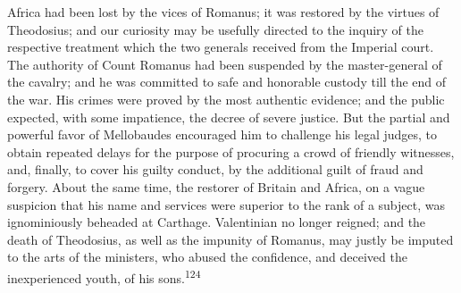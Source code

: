 


Africa had been lost by the vices of Romanus; it was restored by
the virtues of Theodosius; and our curiosity may be usefully
directed to the inquiry of the respective treatment which the two
generals received from the Imperial court. The authority of Count
Romanus had been suspended by the master-general of the cavalry;
and he was committed to safe and honorable custody till the end
of the war. His crimes were proved by the most authentic
evidence; and the public expected, with some impatience, the
decree of severe justice. But the partial and powerful favor of
Mellobaudes encouraged him to challenge his legal judges, to
obtain repeated delays for the purpose of procuring a crowd of
friendly witnesses, and, finally, to cover his guilty conduct, by
the additional guilt of fraud and forgery. About the same time,
the restorer of Britain and Africa, on a vague suspicion that his
name and services were superior to the rank of a subject, was
ignominiously beheaded at Carthage. Valentinian no longer
reigned; and the death of Theodosius, as well as the impunity of
Romanus, may justly be imputed to the arts of the ministers, who
abused the confidence, and deceived the inexperienced youth, of
his sons.\textsuperscript{124}


